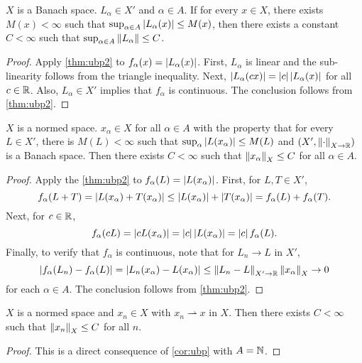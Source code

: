 \begin{corollary}
    $X$ is a Banach space. $L_\alpha\in X'$ and $\alpha\in A$. 
    If for every $x\in X$, there exists $M(x)<\infty$ such that 
    $\sup_{\alpha\in A}\left\lvert {L_\alpha(x)} \right\rvert\leq M(x)$, then there 
    exists a constant $C<\infty$ such that $\sup_{\alpha\in A}
    \left\lVert {L_\alpha} \right\rVert\leq C$.
\end{corollary}
\begin{proof}
    Apply \cref{thm:ubp2} to $f_\alpha(x) = \left\lvert {L_\alpha(x)} \right\rvert$. First,
    $L_\alpha$ is linear and the sub-linearity follows from the triangle 
    inequality. Next, $\left\lvert {L_\alpha(cx)} \right\rvert = \left\lvert {c} \right\rvert\left\lvert {L_\alpha(x)} \right\rvert$ for 
    all $c\in\mathbb{R}$. Also, $L_\alpha\in X'$ implies that $f_\alpha$ is 
    continuous. The conclusion follows from \cref{thm:ubp2}.
\end{proof}

\begin{corollary}\label{cor:ubp}
    $X$ is a normed space. $x_\alpha\in X$ for all $\alpha\in A$ with 
    the property that for every $L\in X'$, there is $M(L)<\infty$ 
    such that $\sup_\alpha \left\lvert {L(x_\alpha)} \right\rvert\leq M(L)$ and 
    $(X',\left\lVert {\cdot} \right\rVert_{X\to\mathbb{R}})$ is a Banach space. Then there exists 
    $C<\infty$ such that $\left\lVert {x_\alpha} \right\rVert_X\leq C$ for all $\alpha\in A$.
\end{corollary}
\begin{proof}
    Apply the \cref{thm:ubp2} to $f_\alpha(L) = \left\lvert {L(x_\alpha)} \right\rvert$. First, 
    for $L,T\in X'$, 
    \begin{equation*}
        f_\alpha(L+T) = \left\lvert {L(x_\alpha)+T(x_\alpha)} \right\rvert 
        \leq \left\lvert {L(x_\alpha)} \right\rvert + \left\lvert {T(x_\alpha)} \right\rvert 
        = f_\alpha(L) + f_\alpha(T).
    \end{equation*}
    Next, for $c\in\mathbb{R}$, 
    \begin{equation*}
        f_\alpha(cL) = \left\lvert {cL(x_\alpha)} \right\rvert = \left\lvert {c} \right\rvert\left\lvert {L(x_\alpha)} \right\rvert 
        = \left\lvert {c} \right\rvert f_\alpha(L).
    \end{equation*}
    Finally, to verify that $f_\alpha$ is continuous, note that for 
    $L_n\to L$ in $X'$, 
    \begin{equation*}
        \left\lvert {f_\alpha(L_n) - f_\alpha(L)} \right\rvert = \left\lvert {L_n(x_\alpha) - L(x_\alpha)} \right\rvert 
        \leq \left\lVert {L_n-L} \right\rVert_{X'\to\mathbb{R}}\left\lVert {x_\alpha} \right\rVert_X\to 0
    \end{equation*}
    for each $\alpha\in A$. The conclusion follows from \cref{thm:ubp2}.
\end{proof}

\begin{corollary}\label{cor:ubp2}
    $X$ is a normed space and $x_n\in X$ with $x_n\rightharpoonup x$ in $X$. 
    Then there exists $C<\infty$ such that $\left\lVert {x_n} \right\rVert_X\leq C$ for all $n$. 
\end{corollary}
\begin{proof}
    This is a direct consequence of \cref{cor:ubp} with $A = \mathbb{N}$.
\end{proof}

